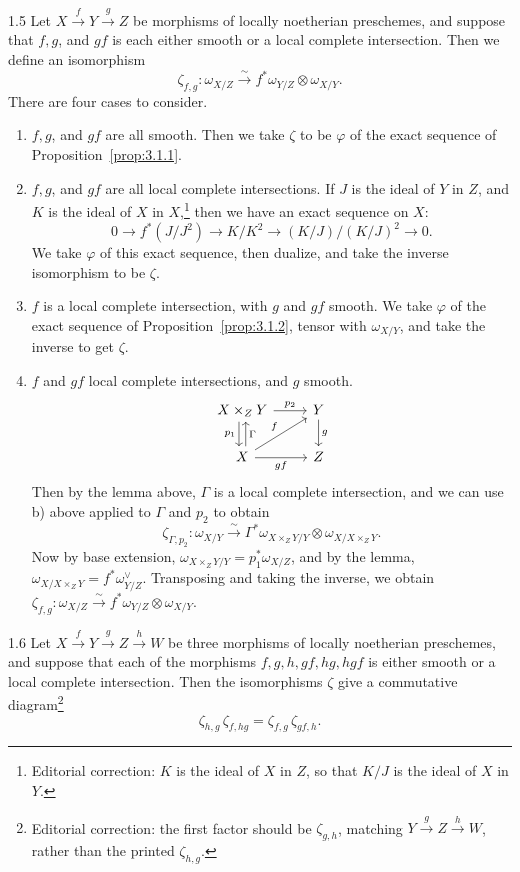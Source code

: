 \begin{bookdefinition}{1.5}\label{def:3.1.5}
Let $X\xrightarrow{f} Y\xrightarrow{g} Z$ be morphisms of locally noetherian preschemes, and suppose that $f,g$, and $gf$ is each either smooth or a local complete intersection. Then we define an isomorphism
\[
\zeta_{f,g}\colon \omega_{X/Z} \xrightarrow{\sim} f^*\omega_{Y/Z}\otimes\omega_{X/Y}.
\]
There are four cases to consider.

\begin{enumerate}
\item[a)] $f,g$, and $gf$ are all smooth. Then we take $\zeta$ to be $\varphi$ of the exact sequence of Proposition~\ref{prop:3.1.1}.
\item[b)] $f,g$, and $gf$ are all local complete intersections. If $J$ is the ideal of $Y$ in $Z$, and $K$ is the ideal of $X$ in $X$,\footnote{Editorial correction: $K$ is the ideal of $X$ in $Z$, so that $K/J$ is the ideal of $X$ in $Y$.} then we have an exact sequence on $X$:
\[
0 \longrightarrow f^*(J/J^2) \longrightarrow K/K^2 \longrightarrow (K/J)/(K/J)^2 \longrightarrow 0.
\]
We take $\varphi$ of this exact sequence, then dualize, and take the inverse isomorphism to be $\zeta$.
\item[c)] $f$ is a local complete intersection, with $g$ and $gf$ smooth. We take $\varphi$ of the exact sequence of Proposition~\ref{prop:3.1.2}, tensor with $\omega_{X/Y}$, and take the inverse to get $\zeta$.
\item[d)] $f$ and $gf$ local complete intersections, and $g$ smooth.
\[
\begin{tikzcd}
	X \times_Z Y
	\arrow[r, "p_2"]
	\arrow[d, shift right, "p_1"']
	& Y
	\arrow[d, "g"] \\
	X
	\arrow[ur, "f"]
	\arrow[r, "gf"']
	\arrow[u, shift right, "\Gamma"']
	& Z
\end{tikzcd}
\] Then by the lemma above, $\Gamma$ is a local complete intersection, and we can use b) above applied to $\Gamma$ and $p_2$ to obtain
\[
\zeta_{\Gamma,p_2}\colon \omega_{X/Y} \xrightarrow{\sim} \Gamma^*\omega_{X\times_Z Y/Y}\otimes\omega_{X/X\times_Z Y}.
\]
Now by base extension, $\omega_{X\times_Z Y/Y}=p_1^*\omega_{X/Z}$, and by the lemma, $\omega_{X/X\times_Z Y}=f^*\omega_{Y/Z}^{\vee}$. Transposing and taking the inverse, we obtain $\zeta_{f,g}\colon\omega_{X/Z}\xrightarrow{\sim} f^*\omega_{Y/Z}\otimes\omega_{X/Y}$.
\end{enumerate}
\end{bookdefinition}

\begin{bookproposition}{1.6}\label{prop:3.1.6}
Let $X\xrightarrow{f} Y\xrightarrow{g} Z\xrightarrow{h} W$ be three morphisms of locally noetherian preschemes, and suppose that each of the morphisms $f,g,h,gf,hg,hgf$ is either smooth or a local complete intersection. Then the isomorphisms $\zeta$ give a commutative diagram\footnote{Editorial correction: the first factor should be $\zeta_{g,h}$, matching $Y\xrightarrow{g}Z\xrightarrow{h}W$, rather than the printed $\zeta_{h,g}$.}
\[
\zeta_{h,g}\,\zeta_{f,hg} = \zeta_{f,g}\,\zeta_{gf,h}.
\]
\end{bookproposition}

